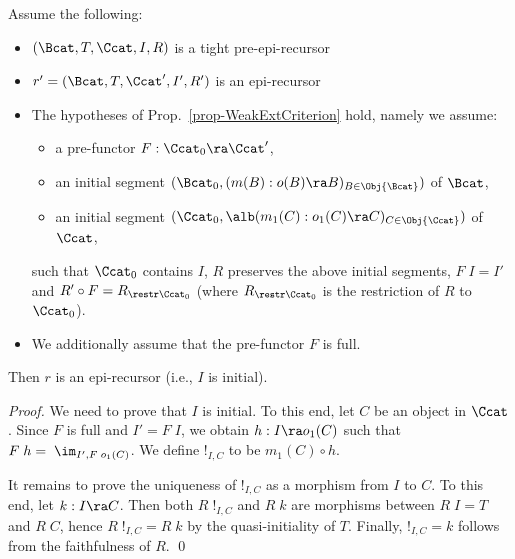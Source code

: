 \medskip 
\begin{prop}\rm \label{prop-borrow} 
	Assume the following:
	\begin{itemize}
		\item $(\Bcat,T,\Ccat,I,R)$ is a tight pre-epi-recursor
		\item $r'= (\Bcat,T,\Ccat',I',R') $ is an epi-recursor
		\item The hypotheses of Prop.~\ref{prop-WeakExtCriterion} hold, 
		namely we assume: 
		\begin{itemize} 
			\item a pre-functor $F : \Ccat_0 \ra \Ccat'$, 
			\item an initial segment $(\Bcat_0,(m(B):o(B)\ra B)_{B \in \Obj{\Bcat}})$ of $\Bcat$, 
			\item an initial segment $(\Ccat_0,\alb(m_1(C):o_1(C)\ra C)_{C \in \Obj{\Ccat}})$ of $\Ccat$, 
		\end{itemize}  		
		such that $\Ccat_0$ contains $I$,  
		$R$ preserves the above initial segments, 
		$F\;I = I'$ and $R' \circ F = R_{\restr\Ccat_0}$ 
		(where $R_{\restr\Ccat_0}$ is the restriction of $R$ to $\Ccat_0$).   
    	\item We additionally assume that the pre-functor $F$ is full. 
	\end{itemize}
	Then $r$ is an epi-recursor (i.e., $I$ is initial).  
\end{prop} 
\medskip
%
\begin{proof}
	We need to prove that $I$ is initial. To this end, let $C$ be an object in $\Ccat$. 
	Since $F$ is full and $I'=F\;I$, we obtain $h : I \ra o_1(C)$ 
	such that $F\;h = \;\im_{I',F\;o_1(C)}$.  We define $!_{I,C}$ to be $m_1(C) \circ h$.
	
	It remains to prove the uniqueness of $!_{I,C}$ as a morphism from $I$ to $C$. To this end, let $k : I \ra C$. 
	Then both $R\;!_{I,C}$ and $R\;k$ are morphisms between $R\;I = T$ and $R\;C$, hence $R\;!_{I,C} = R\;k$ by the quasi-initiality of $T$. Finally, 
	$!_{I,C} = k$ follows from the faithfulness of $R$.  \qed
\end{proof}
\medskip 


